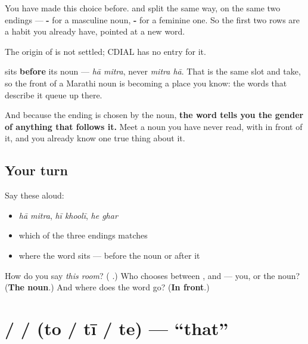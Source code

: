 You have made this choice before. \textbf{} and \textbf{} split the same way, on the same two endings — \textbf{-} for a masculine noun, \textbf{-} for a feminine one. So the first two rows are a habit you already have, pointed at a new word.

\begin{cousinweb}
The origin of \textbf{} is not settled; CDIAL has no entry for it.
\end{cousinweb}

\begin{grammarlens}[title={Grammar Lens: it goes in front, and it never stands alone here}]
\textbf{} sits \textbf{before} its noun — \emph{hā mitra}, never \emph{mitra hā}. That is the same slot \textbf{} and \textbf{} take, so the front of a Marathi noun is becoming a place you know: the words that describe it queue up there.

And because the ending is chosen by the noun, \textbf{the word tells you the gender of anything that follows it.} Meet a noun you have never read, with \textbf{} in front of it, and you already know one true thing about it.
\end{grammarlens}

\subsection*{Your turn}
Say these aloud:

\begin{itemize}
\raggedright
  \item \emph{hā mitra}, \emph{hī khoolī}, \emph{he ghar}
  \item which of the three endings matches \textbf{}
  \item where the word sits — before the noun or after it
\end{itemize}

\begin{tcolorbox}[breakable,colback=teal!4,colframe=teal!35!black,title={Before you move on}]
How do you say \emph{this room}? (\emph{\textbf{ }}.) Who chooses between ,  and  — you, or the noun? (\textbf{The noun}.) And where does the word go? (\textbf{In front}.)
\end{tcolorbox}
\section[\texorpdfstring{\mr{तो} / \mr{ती} / \mr{ते} (to / tī / te)}{तो / ती / ते (to / tī / te)}]{ /  /  (to / tī / te) — \textquotedblleft{}that\textquotedblright{}}

